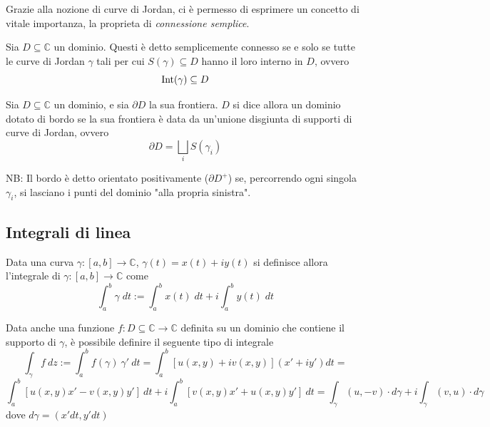             Grazie alla nozione di curve di Jordan, ci è permesso di esprimere un concetto di vitale importanza, la proprieta di \textit{connessione semplice}.

            \begin{definition}
                Sia $D \subseteq \mathbb{C}$ un dominio.
                Questi è detto semplicemente connesso se e solo se tutte le curve di Jordan $\gamma$ tali per cui $S(\gamma) \subseteq D$ hanno il loro interno in $D$, ovvero
                \[
                    \textnormal{Int}(\gamma) \subseteq D
                \]
            \end{definition}

            \begin{definition}
                Sia $D \subseteq \mathbb{C}$ un dominio, e sia $\partial D$ la sua frontiera.
                $D$ si dice allora un dominio dotato di bordo se la sua frontiera è data da un'unione disgiunta di supporti di curve di Jordan, ovvero
                \[
                    \partial D = \bigsqcup_{i} S(\gamma_{i})
                \]

                NB: Il bordo è detto orientato positivamente ($\partial D^{+}$) se, percorrendo ogni singola $\gamma_{i}$, si lasciano i punti del dominio "alla propria sinistra".
            \end{definition}

    \subsection{Integrali di linea}
            Data una curva $\gamma: [a, b] \rightarrow \mathbb{C}$, $\gamma(t) = x(t) + i y(t)$ si definisce allora l'integrale di $\gamma: [a, b] \rightarrow \mathbb{C}$ come
            \[
                \int_{a}^{b} \gamma \; dt := \int_{a}^{b} x(t) \; dt + i \int_{a}^{b} y(t) \; dt
            \]

            Data anche una funzione $f: D \subseteq \mathbb{C} \rightarrow \mathbb{C}$ definita su un dominio che contiene il supporto di $\gamma$, è possibile definire il seguente tipo di integrale
            \[
                \int_{\gamma} f \: dz := \int_{a}^{b} f(\gamma) \: \gamma' \:  dt = \int_{a}^{b} \left[u(x, y) + i v(x, y)\right](x' + i y') dt =
            \]
            \[
                \int_{a}^{b} \left[u(x, y)x' - v(x, y)y'\right] \: dt + i \int_{a}^{b} \left[v(x, y)x' + u(x, y)y'\right] \: dt = \int_{\gamma} (u, -v) \cdot d\gamma + i \int_{\gamma} (v, u) \cdot d\gamma
            \]
            dove $d\gamma = (x' dt, y' dt)$

